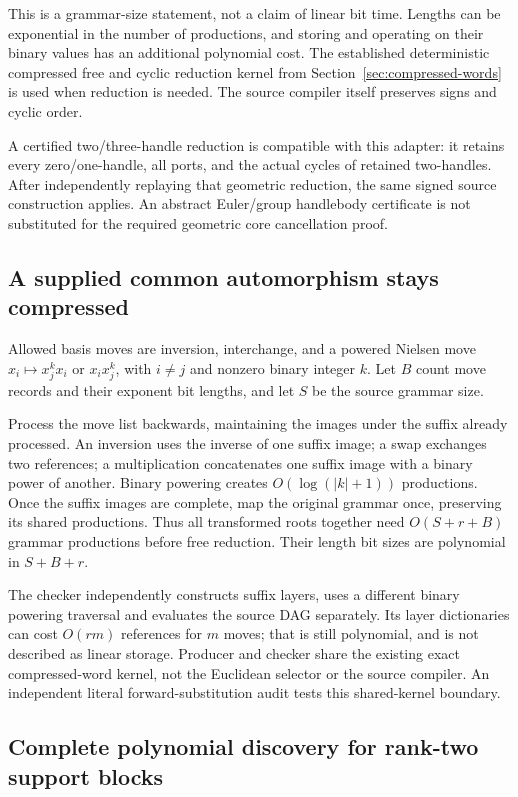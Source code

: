 This is a grammar-size statement, not a claim of linear bit time.
Lengths can be exponential in the number of productions, and storing and
operating on their binary values has an additional polynomial cost.
The established deterministic compressed free and cyclic reduction
kernel from Section~\ref{sec:compressed-words} is used when reduction is
needed.  The source compiler itself preserves signs and cyclic order.

A certified two/three-handle reduction is compatible with this adapter:
it retains every zero/one-handle, all ports, and the actual cycles of
retained two-handles.  After independently replaying that geometric
reduction, the same signed source construction applies.  An abstract
Euler/group handlebody certificate is not substituted for the required
geometric core cancellation proof.

\subsection{A supplied common automorphism stays compressed}

Allowed basis moves are inversion, interchange, and a powered Nielsen
move $x_i\mapsto x_j^k x_i$ or $x_i x_j^k$, with $i\ne j$ and nonzero
binary integer $k$.  Let $B$ count move records and their exponent bit
lengths, and let $S$ be the source grammar size.

Process the move list backwards, maintaining the images under the suffix
already processed.  An inversion uses the inverse of one suffix image;
a swap exchanges two references; a multiplication concatenates one
suffix image with a binary power of another.  Binary powering creates
$O(\log(|k|+1))$ productions.  Once the suffix images are complete, map
the original grammar once, preserving its shared productions.  Thus all
transformed roots together need $O(S+r+B)$ grammar productions before
free reduction.  Their length bit sizes are polynomial in $S+B+r$.

The checker independently constructs suffix layers, uses a different
binary powering traversal and evaluates the source DAG separately.
Its layer dictionaries can cost $O(rm)$ references for $m$ moves; that
is still polynomial, and is not described as linear storage.  Producer
and checker share the existing exact compressed-word kernel, not the
Euclidean selector or the source compiler.  An independent literal
forward-substitution audit tests this shared-kernel boundary.

\subsection{Complete polynomial discovery for rank-two support blocks}

